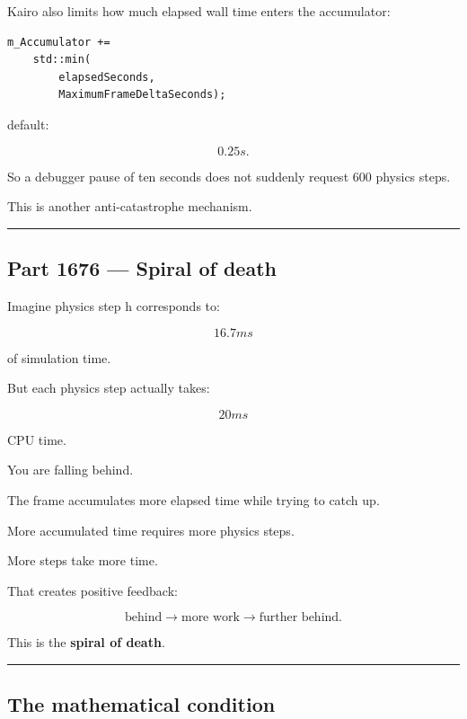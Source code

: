 \hypertarget{06-engine-ii-ch037-maximum-frame-delta}{}

Kairo also limits how much elapsed wall time enters the accumulator:

\begin{verbatim}
m_Accumulator +=
    std::min(
        elapsedSeconds,
        MaximumFrameDeltaSeconds);
\end{verbatim}

default:

\[
0.25s.
\]

So a debugger pause of ten seconds does not suddenly request 600 physics steps.

This is another anti-catastrophe mechanism.

\begin{center}\rule{0.5\linewidth}{0.5pt}\end{center}

\subsection{Part 1676 --- Spiral of death}\label{06-engine-ii-ch037-part-1676-spiral-of-death}

\hypertarget{06-engine-ii-ch037-part-1676-spiral-of-death}{}

Imagine physics step h corresponds to:

\[
16.7ms
\]

of simulation time.

But each physics step actually takes:

\[
20ms
\]

CPU time.

You are falling behind.

The frame accumulates more elapsed time while trying to catch up.

More accumulated time requires more physics steps.

More steps take more time.

That creates positive feedback:

\[
\boxed{
\text{behind}
\rightarrow
\text{more work}
\rightarrow
\text{further behind}.
}
\]

This is the \textbf{spiral of death}.

\begin{center}\rule{0.5\linewidth}{0.5pt}\end{center}

\subsection{The mathematical condition}\label{06-engine-ii-ch037-the-mathematical-condition}

